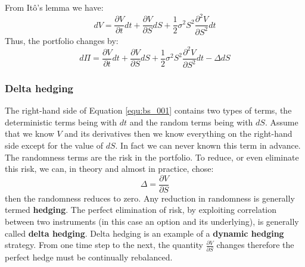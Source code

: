 From Itô's lemma we have:
\begin{equation}
    dV = \frac{\partial V}{\partial t} dt + \frac{\partial V}{\partial S} dS + \frac{1}{2} \sigma^2 S^2 \frac{\partial^2 V}{\partial S^2} dt
\end{equation}
Thus, the portfolio changes by:
\begin{equation}
    d\Pi = \frac{\partial V}{\partial t} dt + \frac{\partial V}{\partial S} dS + \frac{1}{2} \sigma^2 S^2 \frac{\partial^2 V}{\partial S^2} dt - \Delta dS
    \label{equ:bs_001}
\end{equation}


\begin{center}
\begin{footnotesize}
\end{footnotesize}
\end{center}



\subsubsection{Delta hedging}
The right-hand side of Equation \ref{equ:bs_001} contains two types of terms, the deterministic terms being with $dt$ and the random terms being with $dS$. Assume that we know $V$ and its derivatives then we know everything on the right-hand side except for the value of $dS$. In fact we can never known this term in advance. The randomness terms are the risk in the portfolio. To reduce, or even eliminate this risk, we can, in theory and almost in practice, chose:
\begin{equation}
    \Delta = \frac{\partial V}{\partial S}
    \label{equ:bs_002}
\end{equation}
then the randomness reduces to zero. Any reduction in randomness is generally termed \textbf{hedging}. The perfect elimination of risk, by exploiting correlation between two instruments (in this case an option and its underlying), is generally called \textbf{delta hedging}. Delta hedging is an example of a \textbf{dynamic hedging} strategy. From one time step to the next, the quantity $\frac{\partial V}{\partial S}$ changes therefore the perfect hedge must be continually rebalanced. 



